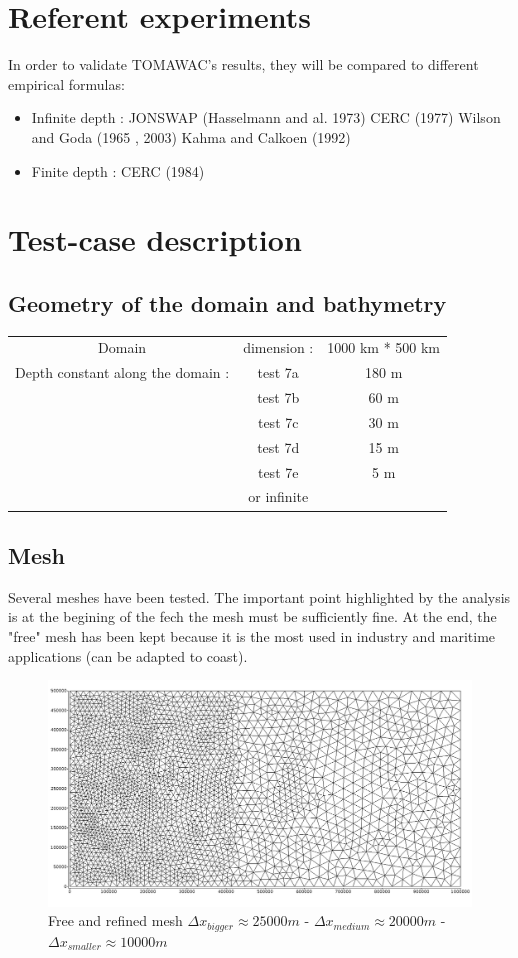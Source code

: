 \documentclass[10pt]{article}
\begin{document}
\section{Referent experiments}
In order to validate TOMAWAC's results, they will be compared to different empirical formulas:
\begin{itemize}
\item Infinite depth :
\subitem JONSWAP (Hasselmann and al. 1973)
\subitem CERC (1977)
\subitem Wilson and Goda (1965 , 2003)
\subitem Kahma and Calkoen (1992)
\item Finite depth :
\subitem CERC (1984)
\end{itemize}
\section{Test-case description}

\subsection{Geometry of the domain and bathymetry}
\begin{tabular}{ccc}
Domain & dimension :& 1000 km * 500 km\\
 Depth constant along the domain :& test 7a & 180 m\\
 & test 7b & 60 m\\ 
& test 7c & 30 m\\ 
& test 7d & 15 m\\
& test 7e & 5 m\\
 & or infinite\\
\end{tabular}
\subsection{Mesh}
Several meshes have been tested. The important point highlighted by the analysis is at the begining of the fech the mesh must be sufficiently fine. At the end, the "free" mesh has been kept because it is the most used in industry and maritime applications (can be adapted to coast).
\quad \vspace{3cm}
\begin{figure}[H]
  \centering
    \includegraphics[scale = 0.35]{freemesh.png}
      \caption{Free and refined mesh $\Delta x_{bigger} \approx 25 000 m$ - $\Delta x_{medium} \approx 20 000 m$ - $\Delta x_{smaller} \approx 10 000 m$}
\end{figure}
\end{document}
